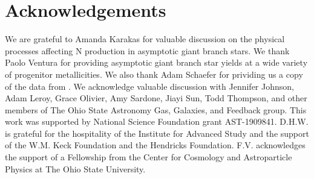 \documentclass[ms.tex]{subfiles}
\begin{document}
\section{Acknowledgements}
\label{sec:acknowledgements}

We are grateful to Amanda Karakas for valuable discussion on the physical
processes affecting N production in asymptotic giant branch stars.
We thank Paolo Ventura for providing asymptotic giant branch star yields at a
wide variety of progenitor metallicities.
We also thank Adam Schaefer for prividing us a copy of the data from
\citet{Schaefer2020}.
We acknowledge valuable discussion with Jennifer Johnson, Adam Leroy, Grace
Olivier, Amy Sardone, Jiayi Sun, Todd Thompson, and other members of The Ohio
State Astronomy Gas, Galaxies, and Feedback group.
This work was supported by National Science Foundation grant AST-1909841.
D.H.W. is grateful for the hospitality of the Institute for Advanced Study and
the support of the W.M. Keck Foundation and the Hendricks Foundation.
F.V. acknowledges the support of a Fellowship from the Center for Cosmology and
Astroparticle Physics at The Ohio State University.
\end{document}
